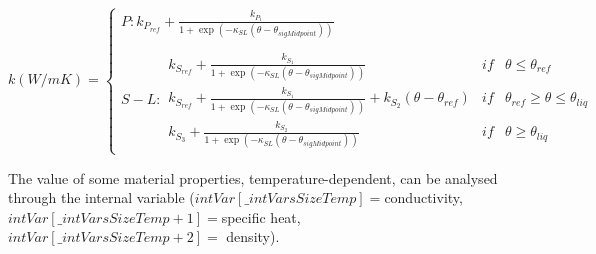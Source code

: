 \documentclass[oneside,11pt,times]{book}
\begin{document}
\begin{enumerate}
    \begin{equation*}
    k (W/mK)=\left\{ \begin{array}{lcc} P:
    k_{P_{ref}} + \frac{k_{P_1}}{1 +\exp(-\kappa_{SL} (\theta -\theta_{sigMidpoint}))}  \\ \\
    S-L: \begin{array}{lcc}
    k_{S_{ref}}+ \frac{k_{S_1}}{1 +\exp(-\kappa_{SL} (\theta -\theta_{sigMidpoint}))} & if & \theta\leq \theta_{ref}\\
    k_{S_{ref}}+ \frac{k_{S_1}}{1 +\exp(-\kappa_{SL} (\theta -\theta_{sigMidpoint}))} + k_{S_2} (\theta - \theta_{ref})  & if & \theta_{ref}\geq \theta\leq\theta_{liq}\\
    k_{S_3}+ \frac{k_{S_2}}{1 +\exp(-\kappa_{SL} (\theta -\theta_{sigMidpoint}))} & if & \theta\geq \theta_{liq}
    \end{array}
    \end{array}
    \right.
    \end{equation*}

    The  value of some material properties, temperature-dependent, can be analysed through the internal variable ($intVar[\_intVarsSizeTemp]=$conductivity, $intVar[\_intVarsSizeTemp+1]=$specific heat, $intVar[\_intVarsSizeTemp+2]=$ density).
    

\end{enumerate}
\end{document}
